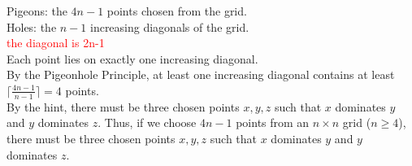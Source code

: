 \documentclass[12pt]{exam}
\begin{document}
\begin{solution}
	Pigeons: the $4n-1$ points chosen from the grid.\\
	Holes: the $n-1$ increasing diagonals of the grid.\\
  \textcolor{red}{the diagonal is 2n-1}\\
	Each point lies on exactly one increasing diagonal.\\
	By the Pigeonhole Principle, at least one increasing diagonal contains at least $\lceil \frac{4n-1}{n-1} \rceil = 4$ points.\\
	By the hint, there must be three chosen points $x, y, z$ such that $x$ dominates $y$ and $y$ dominates $z$.
	Thus, if we choose $4n-1$ points from an $n \times n$ grid ($n\ge 4$), there must be three chosen points $x, y, z$ such that $x$ dominates $y$ and $y$ dominates $z$.
\end{solution}
\end{document}
